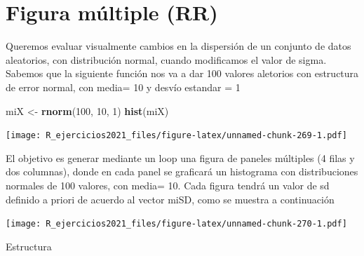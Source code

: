 \documentclass[]{book}
\newenvironment{Shaded}{\begin{snugshade}}{\end{snugshade}}
\newcommand{\DecValTok}[1]{\textcolor[rgb]{0.00,0.00,0.81}{#1}}
\newcommand{\KeywordTok}[1]{\textcolor[rgb]{0.13,0.29,0.53}{\textbf{#1}}}
\newcommand{\NormalTok}[1]{#1}
\newcommand{\StringTok}[1]{\textcolor[rgb]{0.31,0.60,0.02}{#1}}
\begin{document}
\hypertarget{figura-muxfaltiple-rr}{%
\section{Figura múltiple (RR)}\label{figura-muxfaltiple-rr}}

Queremos evaluar visualmente cambios en la dispersión de un conjunto de datos aleatorios, con distribución normal, cuando modificamos el valor de sigma. Sabemos que la siguiente función nos va a dar 100 valores aletorios con estructura de error normal, con media= 10 y desvío estandar = 1

\begin{Shaded}
\begin{Highlighting}[]
\NormalTok{miX <-}\StringTok{ }\KeywordTok{rnorm}\NormalTok{(}\DecValTok{100}\NormalTok{, }\DecValTok{10}\NormalTok{, }\DecValTok{1}\NormalTok{)}
\KeywordTok{hist}\NormalTok{(miX)}
\end{Highlighting}
\end{Shaded}

\texttt{[image: R\_ejercicios2021\_files/figure-latex/unnamed-chunk-269-1.pdf]}

El objetivo es generar mediante un loop una figura de paneles múltiples (4 filas y dos columnas), donde en cada panel se graficará un histograma con distribuciones normales de 100 valores, con media= 10. Cada figura tendrá un valor de sd definido a priori de acuerdo al vector miSD, como se muestra a continuación

\texttt{[image: R\_ejercicios2021\_files/figure-latex/unnamed-chunk-270-1.pdf]}

Estructura
\end{document}
